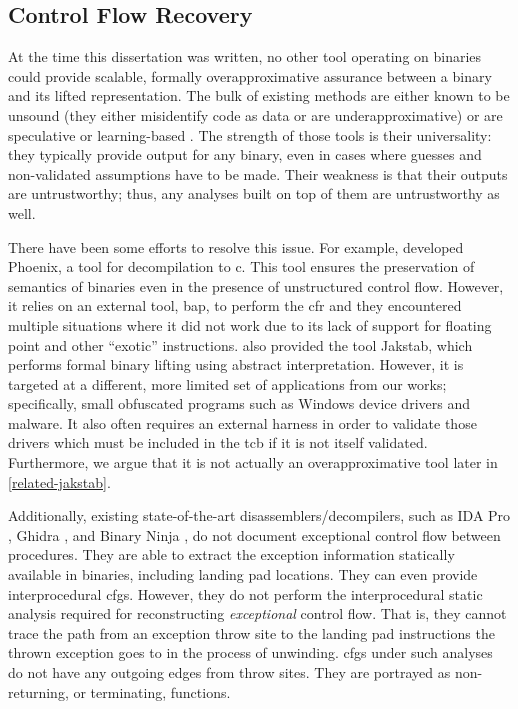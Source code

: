 \subsection{Control Flow Recovery}
At the time this dissertation was written, no other tool operating on binaries could provide scalable, formally overapproximative assurance between a binary and its lifted representation.
The bulk of existing methods are either known to be unsound (they either misidentify code as data or are underapproximative) \autocite{schwartz2002disassembly} or are speculative or learning-based \autocite{wartell2011differentiating,khadra2016speculative,katz2018recurrent}.
The strength of those tools is their universality: they typically provide output for any binary, even in cases where guesses and non-validated assumptions have to be made.
Their weakness is that their outputs are untrustworthy; thus, any analyses built on top of them are untrustworthy as well.

There have been some efforts to resolve this issue.
For example, \textcite{brumley2013native} developed Phoenix, a tool for decompilation to \gls{c}.
This tool ensures the preservation of semantics of binaries even in the presence of unstructured control flow.
However, it relies on an external tool, \gls{bap}, to perform the \gls{cfr} and they encountered multiple situations where it did not work due to its lack of support for floating point and other ``exotic'' instructions.
\Textcite{kinder2010static,kinder2012alternating,kinder2012virtualization} also provided the tool Jakstab, which performs formal binary lifting using abstract interpretation.
However, it is targeted at a different, more limited set of applications from our works; specifically, small obfuscated programs such as Windows device drivers and malware.
It also often requires an external harness in order to validate those drivers which must be included in the \gls{tcb} if it is not itself validated.
Furthermore, we argue that it is not actually an overapproximative tool later in \cref{related-jakstab}.

Additionally, existing state-of-the-art disassemblers/decompilers, such as IDA Pro \autocite{ida}, Ghidra \autocite{ghidra}, and Binary Ninja \autocite{binary-ninja}, do not document exceptional control flow between procedures.
They are able to extract the exception information statically available in binaries, including landing pad locations.
They can even provide interprocedural \glspl{cfg}.
However, they do not perform the interprocedural static analysis required for reconstructing \emph{exceptional} control flow.
That is, they cannot trace the path from an exception throw site to the landing pad instructions the thrown exception goes to in the process of unwinding.
\Glspl{cfg} under such analyses do not have any outgoing edges from throw sites.
They are portrayed as non-returning, or terminating, functions.

